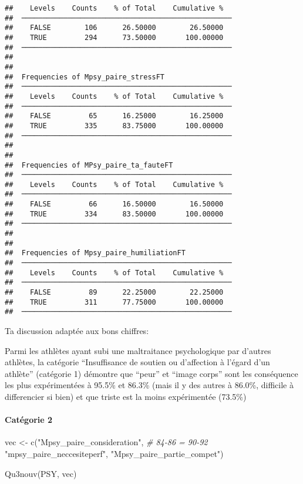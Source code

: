 \documentclass[
]{article}
\newenvironment{Shaded}{\begin{snugshade}}{\end{snugshade}}
\newcommand{\CommentTok}[1]{\textcolor[rgb]{0.56,0.35,0.01}{\textit{#1}}}
\newcommand{\FunctionTok}[1]{\textcolor[rgb]{0.00,0.00,0.00}{#1}}
\newcommand{\NormalTok}[1]{#1}
\newcommand{\OtherTok}[1]{\textcolor[rgb]{0.56,0.35,0.01}{#1}}
\newcommand{\StringTok}[1]{\textcolor[rgb]{0.31,0.60,0.02}{#1}}
\begin{document}
\begin{verbatim}
##    Levels    Counts    % of Total    Cumulative %   
##  ────────────────────────────────────────────────── 
##    FALSE        106      26.50000        26.50000   
##    TRUE         294      73.50000       100.00000   
##  ────────────────────────────────────────────────── 
## 
## 
##  Frequencies of Mpsy_paire_stressFT                 
##  ────────────────────────────────────────────────── 
##    Levels    Counts    % of Total    Cumulative %   
##  ────────────────────────────────────────────────── 
##    FALSE         65      16.25000        16.25000   
##    TRUE         335      83.75000       100.00000   
##  ────────────────────────────────────────────────── 
## 
## 
##  Frequencies of MPsy_paire_ta_fauteFT               
##  ────────────────────────────────────────────────── 
##    Levels    Counts    % of Total    Cumulative %   
##  ────────────────────────────────────────────────── 
##    FALSE         66      16.50000        16.50000   
##    TRUE         334      83.50000       100.00000   
##  ────────────────────────────────────────────────── 
## 
## 
##  Frequencies of Mpsy_paire_humiliationFT            
##  ────────────────────────────────────────────────── 
##    Levels    Counts    % of Total    Cumulative %   
##  ────────────────────────────────────────────────── 
##    FALSE         89      22.25000        22.25000   
##    TRUE         311      77.75000       100.00000   
##  ──────────────────────────────────────────────────
\end{verbatim}

Ta discussion adaptée aux bons chiffres:

Parmi les athlètes ayant subi une maltraitance psychologique par
d'autres athlètes, la catégorie ``Insuffisance de soutien ou d'affection
à l'égard d'un athlète'' (catégorie 1) démontre que ``peur'' et ``image
corps'' sont les conséquence les plus expérimentées à 95.5\% et 86.3\%
(mais il y des autres à 86.0\%, difficile à differencier si bien) et que
triste est la moins expérimentée (73.5\%)

\hypertarget{catuxe9gorie-2}{%
\paragraph{Catégorie 2}\label{catuxe9gorie-2}}

\begin{Shaded}
\begin{Highlighting}[]
\NormalTok{vec }\OtherTok{\textless{}{-}} \FunctionTok{c}\NormalTok{(}\StringTok{"Mpsy\_paire\_consideration"}\NormalTok{,  }\CommentTok{\# 84{-}86 = 90{-}92}
    \StringTok{"mpsy\_paire\_neccesiteperf"}\NormalTok{,}
    \StringTok{"Mpsy\_paire\_partie\_compet"}\NormalTok{)}

\FunctionTok{Qu3nouv}\NormalTok{(PSY, vec)}
\end{Highlighting}
\end{Shaded}
\end{document}
